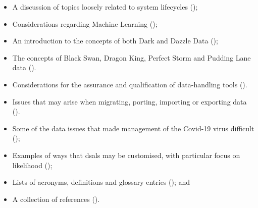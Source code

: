 \begin{itemize}
\begin{itemize}
      \item A discussion of topics loosely related to system lifecycles ();
      \item Considerations regarding Machine Learning ();
      \item An introduction to the concepts of both Dark and Dazzle Data ();
      \item The concepts of Black Swan, Dragon King, Perfect Storm and Pudding Lane data ().
      \item Considerations for the assurance and qualification of data-handling tools ().
      \item Issues that may arise when migrating, porting, importing or exporting data ().            
      \item Some of the data issues that made management of the Covid-19 virus difficult ();
      \item Examples of ways that \glspl{dsal} may be customised, with particular focus on likelihood ();
      \item Lists of acronyms, definitions and glossary entries (); and
      \item A collection of references ().
    \end{itemize}
\end{itemize}

%
%
\makeatletter		%
\dsiwg@intblankpage
\makeatother
\setcounter{tocdepth}{2}
\tableofcontents

%
%
\listoftables
%
\listoffigures
\cleardoublepage%
